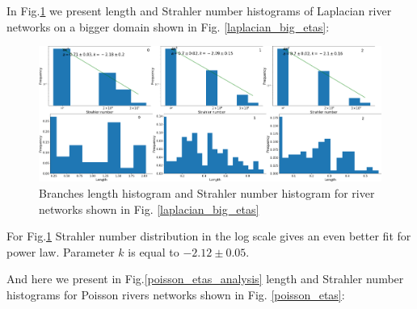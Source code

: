 \documentclass[]{pracamgr}
\begin{document}
        In Fig.\ref{laplacian_big_etas_analysis} we present length and Strahler number histograms of Laplacian river networks on a bigger domain shown in Fig. \ref{laplacian_big_etas}:

        \begin{figure}[H]
          \centering
          \includegraphics[width=1\textwidth]{figs/sims/strahler_and_leght_histogram_for_laplacian_big_field.png}        
          \caption{Branches length histogram and Strahler number histogram for river networks shown in Fig. \ref{laplacian_big_etas}}
          \label{laplacian_big_etas_analysis}
        \end{figure}

        For Fig.\ref{laplacian_big_etas_analysis} Strahler number distribution in the log scale gives an even better fit for power law. Parameter $k$ is equal to $-2.12 \pm 0.05$.

        And here we present in Fig.\ref{poisson_etas_analysis} length and Strahler number histograms for Poisson rivers networks shown in Fig. \ref{poisson_etas}:
\end{document}
